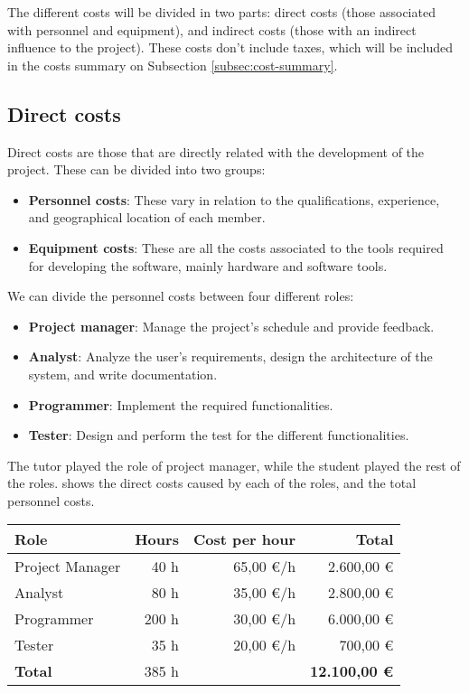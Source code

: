 \makeatother


The different costs will be divided in two parts: direct costs (those associated with personnel and equipment), and indirect costs (those with an indirect influence to the project). These costs don't include taxes, which will be included in the costs summary on Subsection \ref{subsec:cost-summary}.


\subsection{Direct costs}
Direct costs are those that are directly related with the development of the project. These can be divided into two groups:
\begin{itemize}
  \item \textbf{Personnel costs}: These vary in relation to the qualifications, experience, and geographical location of each member.
  \item \textbf{Equipment costs}: These are all the costs associated to the tools required for developing the software, mainly hardware and software tools.
\end{itemize}

\noindent
We can divide the personnel costs between four different roles:
\begin{itemize}
  \item \textbf{Project manager}: Manage the project's schedule and provide feedback.
  \item \textbf{Analyst}: Analyze the user's requirements, design the architecture of the system, and write documentation.
  \item \textbf{Programmer}: Implement the required functionalities.
  \item \textbf{Tester}: Design and perform the test for the different functionalities.
\end{itemize}

The tutor played the role of project manager, while the student played the rest of the roles.  shows the direct costs caused by each of the roles, and the total personnel costs.

\begin{table}[htb]
    {
      \begin{tabular}{lrrr}
        \toprule
        \textbf{Role} & \textbf{Hours} & \textbf{Cost per hour} & \textbf{Total} \\
        \midrule
        Project Manager &  40 h & 65,00 €/h & 2.600,00 € \\
        Analyst         &  80 h & 35,00 €/h & 2.800,00 € \\
        Programmer      & 200 h & 30,00 €/h & 6.000,00 € \\
        Tester          &  35 h & 20,00 €/h &   700,00 € \\
        \midrule
        \textbf{Total}  & 385 h &           & \textbf{12.100,00 €} \\
        \bottomrule
      \end{tabular}
    }
\end{table}

